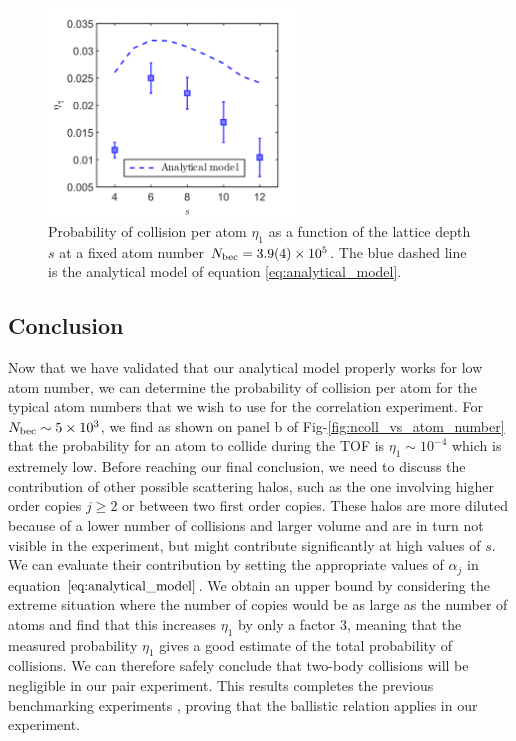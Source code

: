  \begin{figure}
     \centering
     \includegraphics[width=0.6\textwidth]{Fig/Chapter3/ncoll_vs_s.png}
     \caption[Probability of collision per atom as a function of the lattice depth]{Probability of collision per atom $\eta_1$ as a function of the lattice depth $s$ at a fixed atom number $N_{\rm{bec}}=3.9(4) \times 10^5$. The blue dashed line is the analytical model of equation \ref{eq:analytical_model}.}
     \label{fig:ncoll_vs_s}
 \end{figure}

\subsection{Conclusion}

Now that we have validated that our analytical model properly works for low atom number, we can determine the probability of collision per atom for the typical atom numbers that we wish to use for the \kmk correlation experiment. For $N_{\rm{bec}} \sim 5 \times 10^3$, we find as shown on panel b of Fig-\ref{fig:ncoll_vs_atom_number} that the probability for an atom to collide during the TOF is $\eta_1 \sim 10^{-4}$ which is extremely low. Before reaching our final conclusion, we need to discuss the contribution of other possible scattering halos, such as the one involving higher order copies $j \geq 2$ or between two first order copies. These halos are more diluted because of a lower number of collisions and larger volume and are in turn not visible in the experiment, but might contribute significantly at high values of $s$. We can evaluate their contribution by setting the appropriate values of $\alpha_j$ in equation $\ref{eq:analytical_model}$. We obtain an upper bound by considering the extreme situation where the number of copies would be as large as the number of atoms and find that this increases $\eta_1$ by only a factor 3, meaning that the measured probability $\eta_1$ gives a good estimate of the total probability of collisions. We can therefore safely conclude that two-body collisions will be negligible in our \kmk pair experiment. This results completes the previous benchmarking experiments \cite{cayla2018single}, proving that the ballistic relation applies in our experiment.

